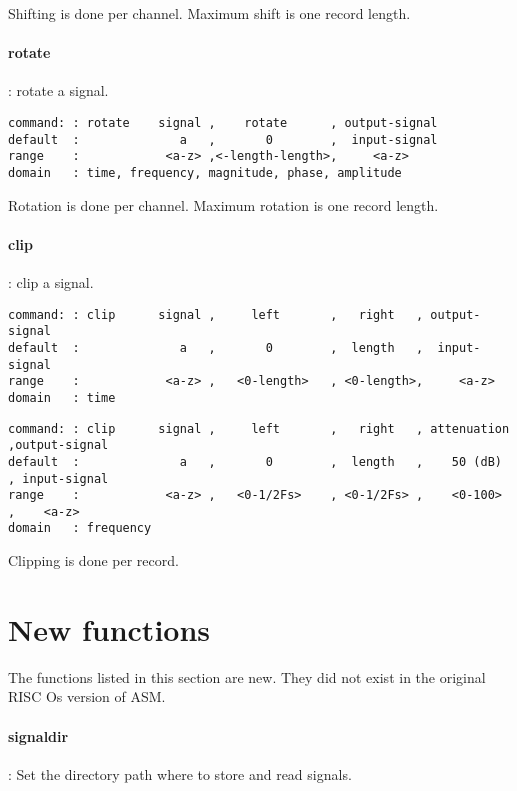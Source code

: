 \documentclass{report}
\newcommand{\bc}{\scriptsize}
\newcommand{\ec}{\normalsize}
\begin{document}
Shifting is done per channel.
Maximum shift is one record length.

\paragraph{rotate}: rotate a signal.

\bc
\begin{verbatim}
command: : rotate    signal ,    rotate      , output-signal
default  :              a   ,       0        ,  input-signal
range    :            <a-z> ,<-length-length>,     <a-z>
domain   : time, frequency, magnitude, phase, amplitude
\end{verbatim}
\ec

Rotation is done per channel.
Maximum rotation is one record length.

\paragraph{clip}: clip a signal.

\bc
\begin{verbatim}
command: : clip      signal ,     left       ,   right   , output-signal
default  :              a   ,       0        ,  length   ,  input-signal
range    :            <a-z> ,   <0-length>   , <0-length>,     <a-z>
domain   : time
\end{verbatim}
\ec

\bc
\begin{verbatim}
command: : clip      signal ,     left       ,   right   , attenuation ,output-signal
default  :              a   ,       0        ,  length   ,    50 (dB)  , input-signal
range    :            <a-z> ,   <0-1/2Fs>    , <0-1/2Fs> ,    <0-100>  ,    <a-z>
domain   : frequency
\end{verbatim}
\ec

Clipping is done per record.


\section{New functions}

The functions listed in this section are new. They did not exist in
the original RISC Os version of ASM.

\paragraph{signaldir}: Set the directory path where to store and read signals.
\end{document}
